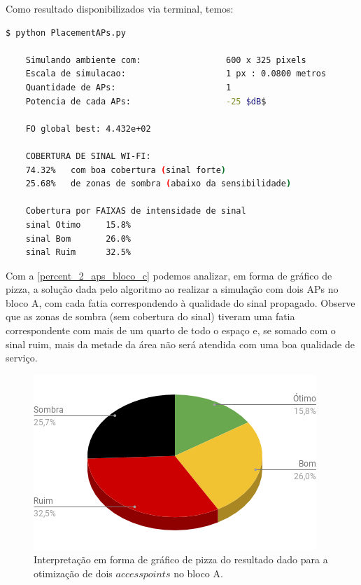 \documentclass[
	12pt,				%
	twoside,			%
	a4paper,			%
	english,			%
	french,				%
	spanish,			%
	brazil				%
	]{abntex2}
\begin{document}
Como resultado disponibilizados via terminal, temos:

\begin{lstlisting}[language=bash]
    $ python PlacementAPs.py 
    
    Simulando ambiente com:                 600 x 325 pixels
    Escala de simulacao:                    1 px : 0.0800 metros
    Quantidade de APs:                      1
    Potencia de cada APs:                   -25 $dB$
    
    FO global best: 4.432e+02
    
    COBERTURA DE SINAL WI-FI:
    74.32%   com boa cobertura (sinal forte)
    25.68%   de zonas de sombra (abaixo da sensibilidade)
    
    Cobertura por FAIXAS de intensidade de sinal
    sinal Otimo     15.8%
    sinal Bom       26.0%
    sinal Ruim      32.5%

\end{lstlisting}

Com a \autoref{percent_2_aps_bloco_c} podemos analizar, em forma de
gráfico de pizza, a solução dada pelo algoritmo ao realizar a simulação
com dois APs no bloco A, com cada fatia correspondendo à qualidade do
sinal propagado. Observe que as zonas de sombra (sem cobertura do sinal)
tiveram uma fatia correspondente com mais de um quarto de todo o espaço
e, se somado com o sinal ruim, mais da metade da área não será atendida
com uma boa qualidade de serviço.

\begin{figure}[ht]
    \caption{\label{percent_2_aps_bloco_c} Interpretação em forma de gráfico de pizza do resultado dado para a otimização
     de dois $access points$ no bloco A.}
    \begin{center}
        \includegraphics[scale=0.7]{imagens/prop-bloco-percent-a-2.png}
    \end{center}
\end{figure}
\end{document}
